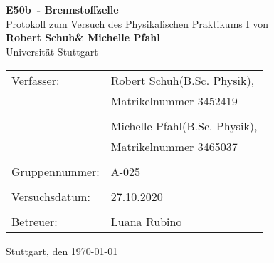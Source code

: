 \documentclass[a4paper,12pt,bibtotocnumbered]{scrartcl}
\numberwithin{equation}{section} %
\newcommand{\VERSUCHSDATUM}{27.10.2020}
\newcommand{\PROTOKOLLDATUM}{\today}
\newcommand{\VerfasserEINS}{Robert Schuh}
\newcommand{\MatNoEINS}{Matrikelnummer 3452419}
\newcommand{\StudiengangEINS}{B.Sc. Physik}
\newcommand{\VerfasserZWEI}{Michelle Pfahl}
\newcommand{\MatNoZWEI}{Matrikelnummer 3465037}
\newcommand{\StudiengangZWEI}{B.Sc. Physik}
\newcommand{\BETREUER}{Luana Rubino}
\newcommand{\GRUPPENNR}{A-025}
\newcommand{\VERSUCHSNR}{E50b}
\newcommand{\VERSUCHSNAME}{Brennstoffzelle}
\begin{document}
\thispagestyle{empty}


\begin{titlepage}

\begin{center}
\Huge{\textbf{\VERSUCHSNR\ - \VERSUCHSNAME}}\\%
\vspace{10mm}%
\Large{Protokoll zum Versuch des Physikalischen Praktikums I von \\ \textbf{\VerfasserEINS\;\& \VerfasserZWEI}}\\
\vspace{10mm} 
\Large{Universität Stuttgart}\\
\end{center}
\vspace{1cm}
\begin{center}
\begin{tabular}{ll}
\large{Verfasser:}		& \large{\VerfasserEINS\;(\StudiengangEINS),} \\ 
 						& \large{\MatNoEINS} \\
 						\vspace{0cm}\\
						& \large{\VerfasserZWEI\;(\StudiengangZWEI),} \\
						& \large{\MatNoZWEI} \\
						\vspace{0cm}\\
\large{Gruppennummer:}	& \large{\GRUPPENNR} \\
\vspace{0cm}\\
\large{Versuchsdatum:}	& \large{\VERSUCHSDATUM} \\
\vspace{0cm}\\
\large{Betreuer:}		& \large{\BETREUER}
\end{tabular}
\end{center}
\vspace{15mm}

\begin{center}
Stuttgart, den \PROTOKOLLDATUM
\end{center}

\end{titlepage}


\thispagestyle{empty}
\tableofcontents 
\clearpage %
\end{document}
